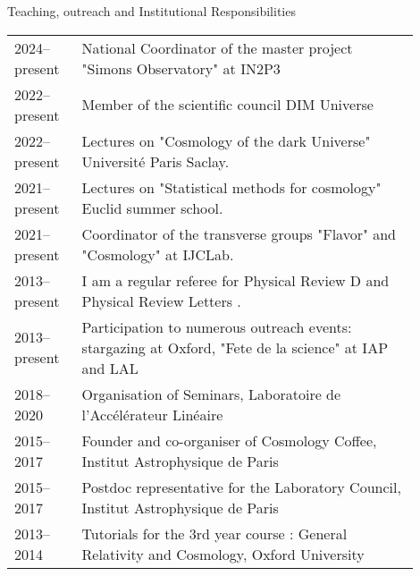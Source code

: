 \documentclass{resume} %
\begin{document}
\begin{rSection}{Teaching, outreach and Institutional Responsibilities}
\vspace{-0.4cm}
\begin{table}[h]
{\def\arraystretch{1.5}\tabcolsep=0pt
\begin{tabular}{p{0.15\linewidth}p{0.75\linewidth}}
2024--present &   National Coordinator of the master project "Simons Observatory" at IN2P3  \\
2022--present &   Member of the scientific council DIM Universe  \\
2022--present &   Lectures on "Cosmology of the dark Universe"  Université Paris Saclay. \\
2021--present &   Lectures on "Statistical methods for cosmology"  Euclid summer school. \\
2021--present &  Coordinator of the transverse groups "Flavor" and "Cosmology" at IJCLab. \\
2013--present &  I am a regular referee for Physical Review D and Physical Review Letters .  \\
2013--present & Participation to numerous outreach events: stargazing at Oxford, "Fete de la science" at IAP and LAL \\
2018--2020 &  Organisation of Seminars, Laboratoire de l'Accélérateur Linéaire  \\
2015--2017 &  Founder and co-organiser of Cosmology Coffee, Institut Astrophysique de Paris  \\
2015--2017 &  Postdoc representative for the Laboratory Council, Institut Astrophysique de Paris \\
2013--2014 &  Tutorials for the 3rd year course : General Relativity and Cosmology, Oxford University \\
\end{tabular}%
}
\end{table}
\vspace{-0.6cm}
\end{rSection}
\end{document}
